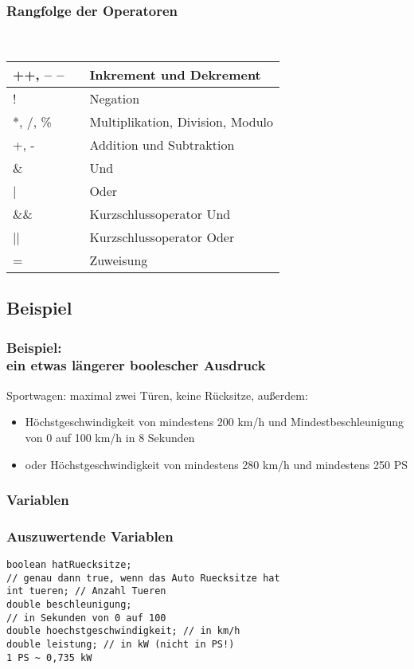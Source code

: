 \documentclass[final]{beamer}
\begin{document}
\begin{frame}
	\frametitle{Rangfolge der Operatoren}
	\\
	\begin{center}
	\begin{tabular}{|l c | l|}
	 \hline
		++, -- --  & &  Inkrement und Dekrement \\
		 \hline
		! & & Negation \\ \hline
		
		*, /, \% & & Multiplikation, Division, Modulo \\ \hline
		+, - & & Addition und Subtraktion \\ \hline
		\& & & Und \\ \hline
		| & & Oder \\ \hline
		\&\& & & Kurzschlussoperator Und \\ \hline
		|| & & Kurzschlussoperator Oder \\ \hline
		= & & Zuweisung \\
		 \hline
	\end{tabular}
	\end{center}
\end{frame}

\subsection{Beispiel}
\begin{frame}
	\frametitle{Beispiel: \\ein etwas längerer boolescher Ausdruck}
	Sportwagen: maximal zwei Türen, keine Rücksitze, außerdem:
	\begin{itemize}
		\item{Höchstgeschwindigkeit von mindestens 200 km/h und  Mindestbeschleunigung von 0 auf 100 km/h in 8 Sekunden}
		\item{oder Höchstgeschwindigkeit von mindestens 280 km/h und mindestens 250 PS}
	\end{itemize}
\end{frame}

\subsubsection{Variablen}
\begin{frame}[containsverbatim]
	\frametitle{Auszuwertende Variablen}
	\begin{lstlisting}
boolean hatRuecksitze; 
// genau dann true, wenn das Auto Ruecksitze hat
int tueren; // Anzahl Tueren
double beschleunigung; 
// in Sekunden von 0 auf 100
double hoechstgeschwindigkeit; // in km/h
double leistung; // in kW (nicht in PS!)
1 PS ~ 0,735 kW
	\end{lstlisting}
\end{frame}
\end{document}
